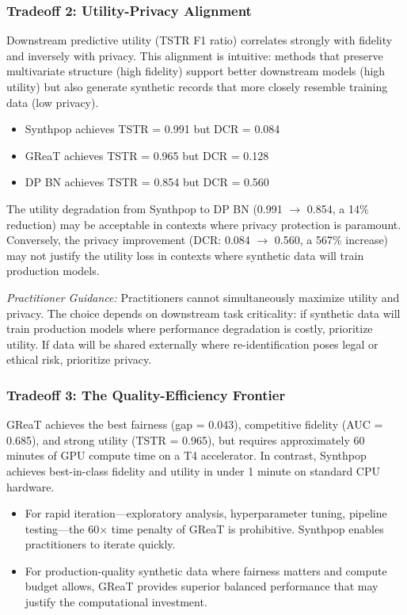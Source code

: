 \documentclass[12pt,a4paper]{article}
\begin{document}
\subsubsection{Tradeoff 2: Utility-Privacy Alignment}

Downstream predictive utility (TSTR F1 ratio) correlates strongly with fidelity and inversely with privacy. This alignment is intuitive: methods that preserve multivariate structure (high fidelity) support better downstream models (high utility) but also generate synthetic records that more closely resemble training data (low privacy).

\begin{itemize}
    \item Synthpop achieves TSTR = 0.991 but DCR = 0.084
    \item GReaT achieves TSTR = 0.965 but DCR = 0.128
    \item DP BN achieves TSTR = 0.854 but DCR = 0.560
\end{itemize}

The utility degradation from Synthpop to DP BN (0.991 $\rightarrow$ 0.854, a 14\% reduction) may be acceptable in contexts where privacy protection is paramount. Conversely, the privacy improvement (DCR: 0.084 $\rightarrow$ 0.560, a 567\% increase) may not justify the utility loss in contexts where synthetic data will train production models.

\textit{Practitioner Guidance:} Practitioners cannot simultaneously maximize utility and privacy. The choice depends on downstream task criticality: if synthetic data will train production models where performance degradation is costly, prioritize utility. If data will be shared externally where re-identification poses legal or ethical risk, prioritize privacy.

\subsubsection{Tradeoff 3: The Quality-Efficiency Frontier}

GReaT achieves the best fairness (gap = 0.043), competitive fidelity (AUC = 0.685), and strong utility (TSTR = 0.965), but requires approximately 60 minutes of GPU compute time on a T4 accelerator. In contrast, Synthpop achieves best-in-class fidelity and utility in under 1 minute on standard CPU hardware.

\begin{itemize}
    \item For rapid iteration---exploratory analysis, hyperparameter tuning, pipeline testing---the 60$\times$ time penalty of GReaT is prohibitive. Synthpop enables practitioners to iterate quickly.
    \item For production-quality synthetic data where fairness matters and compute budget allows, GReaT provides superior balanced performance that may justify the computational investment.
\end{itemize}
\end{document}
